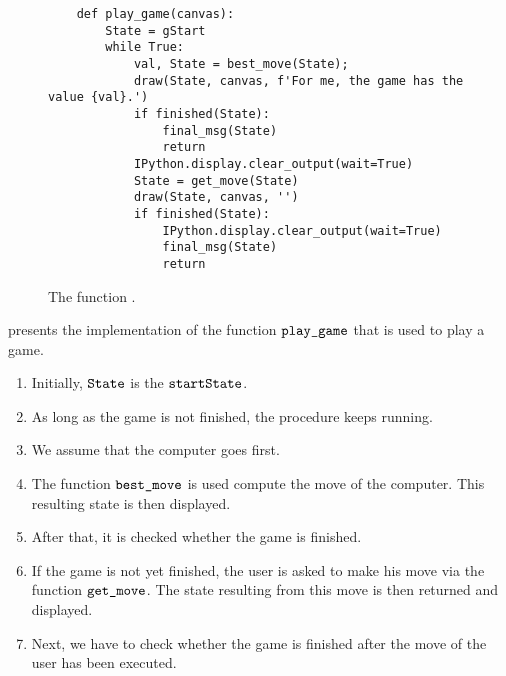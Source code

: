 \begin{figure}[!ht]
\centering
\begin{verbatim}
    def play_game(canvas):
        State = gStart
        while True: 
            val, State = best_move(State);
            draw(State, canvas, f'For me, the game has the value {val}.')
            if finished(State):
                final_msg(State)
                return
            IPython.display.clear_output(wait=True)
            State = get_move(State)
            draw(State, canvas, '')
            if finished(State):
                IPython.display.clear_output(wait=True)
                final_msg(State)
                return
\end{verbatim}
\caption{The function .}
\label{fig:Minimax.ipynb:play_game}
\end{figure}
\FloatBarrier

 presents the implementation of the function $\texttt{play\_game}$ that is used to play a game.
\begin{enumerate}
\item Initially, $\texttt{State}$ is the $\texttt{startState}$.
\item As long as the game is not finished, the procedure keeps running.
\item We assume that the computer goes first.
\item The function $\texttt{best\_move}$ is used compute the move of the computer.
      This resulting state is then displayed.
\item After that, it is checked whether the game is finished.
\item If the game is not  yet finished, the user is asked to make his move via the function
      $\texttt{get\_move}$. The state resulting from this move is then returned and displayed.
\item Next, we have to check whether the game is finished after the  move of the user has been executed.
\end{enumerate}

